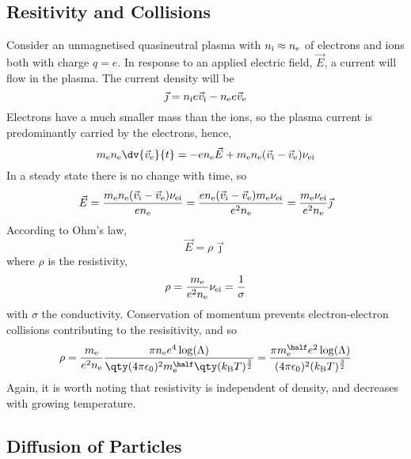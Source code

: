 \documentclass{book}         		                %
\begin{document}
\subsection{Resitivity and Collisions}
\label{sec:resit-coll}

Consider an unmagnetised quasineutral plasma with $n_{\rm i} \approx
n_{\rm e}$ of electrons and ions both with charge $q = e$. In response
to an applied electric field, $\vec{E}$, a current will flow in the
plasma. The current density will be 
\begin{equation}
  \label{eq:22}
  \vec{\jmath} = n_{\rm i} e \vec{v}_{\rm i} - n_{\rm e} e \vec{v}_{\rm e}
\end{equation}
Electrons have a much smaller mass than the ions, so the plasma
current is predominantly carried by the electrons, hence,
\begin{equation}
  \label{eq:23}
  m_{\rm e} n_{\rm e} \dv{\vec{v}_{\rm e}}{t} = -e n_{\rm e} \vec{E} + m_{\rm e} n_{\rm e} (\vec{v}_{\rm i} - \vec{v}_{\rm e}) \nu_{\rm ei}
\end{equation}
In a steady state there is no change with time, so
\[ \vec{E} = \frac{m_{\rm e} n_{\rm e} (\vec{v}_{\rm i} - \vec{v}_{\rm e}) \nu_{\rm ei}}{e n_{\rm e}} = \frac{e n_{\rm e} (\vec{v}_{\rm i}-\vec{v}_{\rm e} ) m_{\rm e} \nu_{\rm ei}}{e^2 n_{\rm e}} = \frac{m_{\rm e} \nu_{\rm ei}}{e^2 n_{\rm e}} \vec{\jmath} \]
According to Ohm's law,
\begin{equation}
  \label{eq:24}
  \vec{E} = \rho \vec{\jmath}
\end{equation}
where $\rho$ is the resistivity,
\[ \rho = \frac{m_{\rm e}}{e^2 n_{\rm e}} \nu_{\rm ei} =
\frac{1}{\sigma} \] with $\sigma$ the conductivity.  Conservation of
momentum prevents electron-electron collisions contributing to the
resisitivity, and so
\[ \rho = \frac{m_{\rm e}}{e^2 n_{\rm e}} \frac{\pi n_{\rm e} e^4
  \log(\Lambda)}{\qty(4 \pi \epsilon_0)^2 m_{\rm e}^{\half}
  \qty(k_{\rm B} T)^{\frac{3}{2}}} = \frac{\pi m_{\rm e}^{\half} e^2
  \log(\Lambda)}{(4 \pi \epsilon_0)^2 (k_{\rm B}T)^{\frac{3}{2}}} \]
Again, it is worth noting that resistivity is independent of density,
and decreases with growing temperature.

\subsection{Diffusion of Particles}
\label{sec:diffusion-particles}
\end{document}
